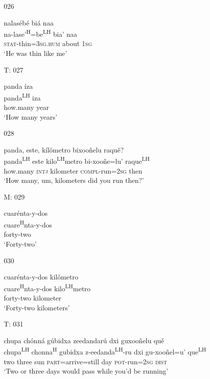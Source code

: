 \begin{itemize}
\item[026]
    
\glll nalas\'{e}b\'{e} bi\'{a} naa \\
na-lase'\textsuperscript{H}=be\textsuperscript{LH} bia' naa \\
\textsc{stat}-thin=\textsc{3sg.hum} about \textsc{1sg} \\
\glt `He was thin like me'
 


\item[T: 027]
   
\glll panda \'{i}za \\
panda\textsuperscript{LH} iza \\
how.many year \\
\glt `How many years'
 

\item[028]
   
\glll panda, este, k\'{i}l\v{o}metro bixoo\~{n}elu raqu\v{e}? \\
panda\textsuperscript{LH}  este kilo\textsuperscript{LH}metro bi-xoo\~{n}e=lu' raque\textsuperscript{LH}  \\
how.many \textsc{intj} kilometer \textsc{compl}-run=\textsc{2sg} then \\
\glt `How many, um, kilometers did you run then?'
 

\item[M: 029]
  
\glll cuar\'{e}nta-y-dos \\
cuare\textsuperscript{H}nta-y-dos \\
forty-two \\
\glt `Forty-two'
 

\item[030]
  
\glll cuar\'{e}nta-y-dos kil\v{o}metro \\
cuare\textsuperscript{H}nta-y-dos kilo\textsuperscript{LH}metro \\
forty-two kilometer \\
\glt `Forty-two kilometers'
 

\item[T: 031]
 
\glll  chupa ch\'{o}nn\'{a} g\'{u}bidxa zeedandar\'{u} dxi guxoo\~{n}elu qu\v{e} \\
chupa\textsuperscript{LH} chonna\textsuperscript{H} gubidxa z-eedanda\textsuperscript{LH}-ru dxi gu-xoo\~{n}el=u' que\textsuperscript{LH} \\
two three sun \textsc{part}=arrive=still day \textsc{pot}-run=\textsc{2sg} \textsc{dist} \\
\glt `Two or three days would pass while you'd be running'
 


\end{itemize}
